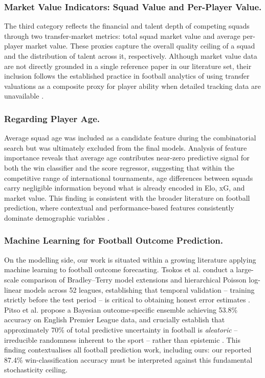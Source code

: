 \documentclass[a4paper,twoside]{article}
\begin{document}
\subsubsection*{Market Value Indicators: Squad Value and Per-Player Value.}
The third category reflects the financial and talent depth of competing squads through two transfer-market metrics: total squad market value and average per-player market value.
These proxies capture the overall quality ceiling of a squad and the distribution of talent across it, respectively.
Although market value data are not directly grounded in a single reference paper in our literature set, their inclusion follows the established practice in football analytics of using transfer valuations as a composite proxy for player ability when detailed tracking data are unavailable \cite{mead_expected_2023}.

\subsubsection*{Regarding Player Age.}
Average squad age was included as a candidate feature during the combinatorial search but was ultimately excluded from the final models.
Analysis of feature importance reveals that average age contributes near-zero predictive signal for both the win classifier and the score regressor, suggesting that within the competitive range of international tournaments, age differences between squads carry negligible information beyond what is already encoded in Elo, xG, and market value.
This finding is consistent with the broader literature on football prediction, where contextual and performance-based features consistently dominate demographic variables \cite{pitso_bayesian_2026}.

\subsubsection*{Machine Learning for Football Outcome Prediction.}
On the modelling side, our work is situated within a growing literature applying machine learning to football outcome forecasting.
Tsokos et al. conduct a large-scale comparison of Bradley--Terry model extensions and hierarchical Poisson log-linear models across 52 leagues, establishing that temporal validation -- training strictly before the test period -- is critical to obtaining honest error estimates \cite{tsokos_modeling_2019}.
Pitso et al. propose a Bayesian outcome-specific ensemble achieving 53.8\% accuracy on English Premier League data, and crucially establish that approximately 70\% of total predictive uncertainty in football is \textit{aleatoric} -- irreducible randomness inherent to the sport -- rather than epistemic \cite{pitso_bayesian_2026}.
This finding contextualises all football prediction work, including ours: our reported 87.4\% win-classification accuracy must be interpreted against this fundamental stochasticity ceiling.
\end{document}
